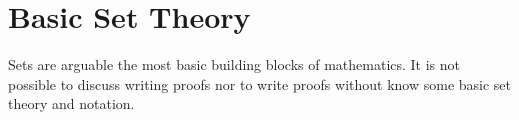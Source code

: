 \chapter{Basic Set Theory}

Sets are arguable the most basic building blocks of mathematics.  It is not possible to discuss writing proofs nor to write proofs without know some basic set theory and notation.
\begin{center}
\end{center}


